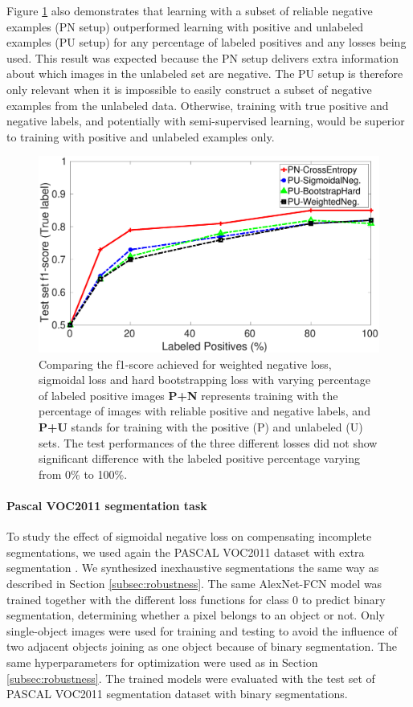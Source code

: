 Figure \ref{fig:pct_annotating} also demonstrates that learning with a subset of reliable negative examples (PN setup) outperformed learning with positive and unlabeled examples (PU setup) for any percentage of labeled positives and any losses being used.
This result was expected because the PN setup delivers extra information about which images in the unlabeled set are negative.
The PU setup is therefore only relevant when it is impossible to easily construct a subset of negative examples from the unlabeled data.
Otherwise, training with true positive and negative labels, and potentially with semi-supervised learning, would be superior to training with positive and unlabeled examples only.

\begin{figure}[t]
\centering
   \includegraphics[width=1.05\linewidth]{img/pu_vs_pn}
\caption{
Comparing the f1-score achieved for weighted negative loss, sigmoidal loss and hard bootstrapping loss with varying percentage of labeled positive images
\textbf{P+N} represents training with the percentage of images with reliable positive and negative labels, and \textbf{P+U} stands for training with the positive (P) and unlabeled (U) sets.
The test performances of the three different losses did not show significant difference with the labeled positive percentage varying from 0\% to 100\%.
}
\label{fig:pct_annotating}
\end{figure}

\paragraph{Pascal VOC2011 segmentation task}

To study the effect of sigmoidal negative loss on compensating incomplete segmentations, we used again the PASCAL VOC2011 dataset with extra segmentation \cite{hariharan2011semantic}.
We synthesized inexhaustive segmentations the same way as described in Section \ref{subsec:robustness}.
The same AlexNet-FCN model was trained together with the different loss functions for class 0 to predict binary segmentation, determining whether a pixel belongs to an object or not.
Only single-object images were used for training and testing to avoid the influence of two adjacent objects joining as one object because of binary segmentation.
The same hyperparameters for optimization were used as in Section \ref{subsec:robustness}.
The trained models were evaluated with the test set of PASCAL VOC2011 segmentation dataset with binary segmentations.

